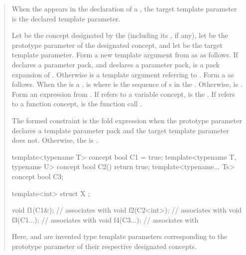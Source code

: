 \begin{quote}
When the 
appears in the declaration of a 
,
the target template parameter is the declared template parameter.


\pnum
Let  be the concept designated by the
 (including its 
, if any),
let  be the prototype parameter of the designated
concept, and let  be the target template parameter.
% 
Form a new template argument  from  as
as follows. If  declares a parameter pack, and
 declares a parameter pack, 
is a pack expansion of . Otherwise  is
a template argument referring to .
% 
Form a  
as follows. 
% 
When the  is a 
,  is 
 where  is the sequence of 
s in the
.
% 
Otherwise,  is .
% 
Form an expression  from . If  refers to a 
variable concept,  is the  .
% 
If  refers to a function concept,  is the function call 
.

\pnum
The formed constraint is the fold expression 
when the prototype parameter  declares a template parameter pack and 
the target template parameter  does not.
% 
Otherwise, the  is .
% 
\enterexample
\begin{codeblock}
template<typename T> concept bool C1 = true;
template<typename T, typename U> concept bool C2() { return true; }
template<typename... Ts> concept bool C3;

template<int> struct X { };

void f1(C1&);     // associates  with 
void f2(C2<int>); // associates  with 
void f3(C1...);   // associates  with 
void f4(C3...);   // associates  with 
\end{codeblock}
% 
Here,  and  are invented type template parameters 
corresponding to the prototype parameter of their respective designated 
concepts.

\end{quote}
